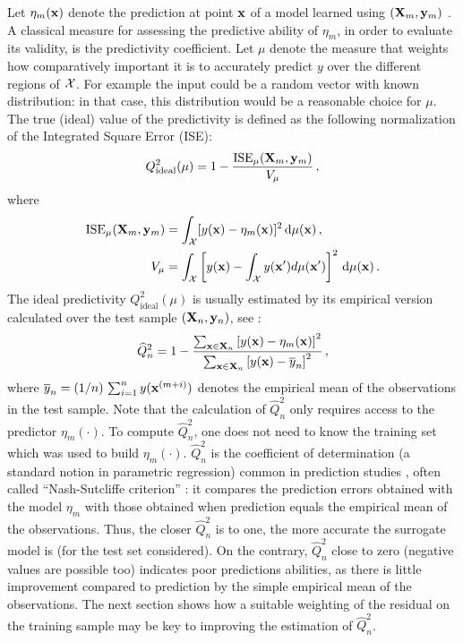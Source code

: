 Let $\eta_m({\bf x})$ denote the prediction at point ${\bf x}$ of a model learned using $({\bf X}_m,{\bf y}_m)$ \cite{hastib09,raswil06}. 
A classical measure for assessing the predictive ability of $\eta_m$, in order to evaluate its validity, is the predictivity coefficient. 
Let $\mu$ denote the measure that weights how comparatively important it is to accurately predict $y$ over the different regions of $\mathcal{X}$. 
For example the input could be a random vector with known distribution: in that case, this distribution would be a reasonable choice for $\mu$. 
The true (ideal) value of the predictivity is defined as the following normalization of the Integrated Square Error (ISE): 
\begin{equation}\label{eq:Q2th}
Q_{\mathrm{ideal}}^2(\mu) = 1 - \frac{\mathrm{ISE}_\mu({\bf X}_m,{\bf y}_m)}{V_\mu} \,, 
\end{equation}
where
\begin{align*}
    \mathrm{ISE}_\mu({\bf X}_m,{\bf y}_m) &= \int_{\mathcal{X}} [y({\bf x})-\eta_m({\bf x})]^2 \, \mathrm{d}\mu({\bf x}) \,, \\
    V_\mu &= \int_{\mathcal{X}} \left[y({\bf x})-\int_{\mathcal{X}} y({\bf x}') d\mu({\bf x}') \right]^2 \, \mathrm{d}\mu({\bf x})\,.
\end{align*}
The ideal predictivity $Q_{\mathrm{ideal}}^2(\mu)$ is usually estimated by its empirical version calculated over the test sample $({\bf X}_n,{\bf y}_n)$, see \cite[p.~32]{davgam21}: 
\begin{equation}\label{eq:Q2test}
\widehat Q^2_n = 1 - \frac{ \sum_{{\bf x} \in {\bf X}_n}  \left[ y({\bf x})-\eta_m({\bf x})\right]^2}{\sum_{{\bf x} \in {\bf X}_n}  \left[y({\bf x})-\overline{y}_n\right]^2}\,,
\end{equation}
where $\overline{y}_n=(1/n)\,\sum_{i=1}^n y({\bf x}^{(m+i)})$ denotes the empirical mean of the observations in the test sample. 
Note that the calculation of $\widehat Q^2_n$ only requires access to the predictor $\eta_m(\cdot)$. 
To compute $\widehat Q^2_n$, one does not need to know the training set which was used to build $\eta_m(\cdot)$. 
$\widehat Q^2_n$ is the coefficient of determination (a standard notion in parametric regression) common in prediction studies \cite{klesar00,ioobou10}, often called ``Nash-Sutcliffe criterion'' \cite{NashS70}: 
it compares the prediction errors obtained with the model $\eta_m$ with those obtained when prediction equals the empirical mean of the observations. 
Thus, the closer $\widehat Q^2_n$ is to one, the more accurate the surrogate model is (for the test set considered). 
On the contrary, $\widehat Q^2_n$ close to zero (negative values are possible too) indicates poor predictions abilities, as there is little improvement compared to prediction by the simple empirical mean of the observations.  
The next section shows how a suitable weighting of the residual on the training sample may be key to improving the  estimation of $\widehat Q^2_n$. 

